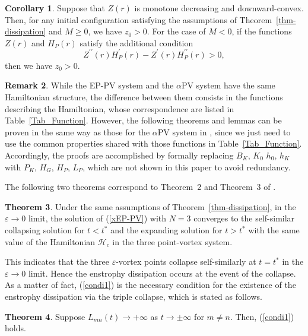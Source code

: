 \documentclass{article}
\theoremstyle{definition}
\newtheorem{theorem}{Theorem}[section]
\newtheorem{corollary}[theorem]{Corollary}
\newtheorem{remark}[theorem]{Remark}
\begin{document}
\begin{corollary}
Suppose that $Z(r)$ is monotone decreasing and downward-convex. Then, for any initial configuration satisfying the assumptions of Theorem~\ref{thm-dissipation} and $M \geq 0$, we have $z_0 > 0$. For the case of $M < 0$, if the functions $Z(r)$ and $H_P(r)$ satisfy the additional condition
\begin{equation}
Z^{\prime\prime}(r) H^\prime_P(r) - Z^\prime(r) H^{\prime\prime}_P(r) > 0,  \label{condi-dissipation}
\end{equation}
then we have $z_0 > 0$. 

\label{Dissipation}
\end{corollary}

\begin{remark}
While the EP-PV system and the $\alpha$PV system have the same Hamiltonian structure, the difference between them consists in the functions describing the Hamiltonian, whose 
correspondence are listed in Table~\ref{Tab_Function}. However, the following theorems and lemmas can be proven in the same way as those for the $\alpha$PV system in \cite{G.2}, 
since we just need to use the common properties shared with those functions in Table~\ref{Tab_Function}. Accordingly, the proofs are accomplished by formally replacing $B_K$, $K_0$
$h_0$, $h_K$ with $P_K$, $H_G$, $H_P$, $L_P$, which are not shown in this paper to avoid redundancy. 
\label{rem-proof}
\end{remark}
The following two theorems correspond to Theorem~2 and Theorem~3 of \cite{G.2}. 
\begin{theorem}
Under the same assumptions of Theorem~\ref{thm-dissipation}, in the $\varepsilon \rightarrow 0$ limit, the solution of (\ref{xEP-PV}) with $N =3$ converges to the self-similar collapsing solution for $t < t^\ast$ and the expanding solution for $t > t^\ast$ with the same value of the Hamiltonian $\mathscr{H}_c$ in the three point-vortex system.
\label{convergence}
\end{theorem}
This indicates that the three $\varepsilon$-vortex points collapse self-similarly at $t=t^\ast$ in the $\varepsilon \rightarrow 0$ limit. Hence the enstrophy dissipation occurs at the event of the collapse. 
As a matter of fact, (\ref{condi1}) is the necessary condition for the existence of the enstrophy dissipation via the triple collapse, which is stated as follows.
\begin{theorem}
Suppose $L_{mn}(t) \rightarrow +\infty$ as $t \rightarrow \pm \infty$ for $m \neq n$. Then, (\ref{condi1}) holds.  \label{necessary}
\end{theorem}
\end{document}
